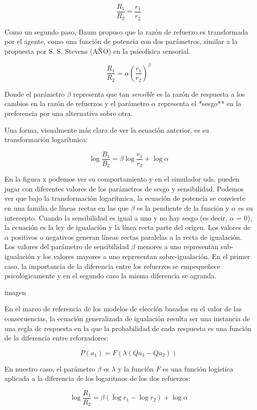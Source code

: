 \documentclass[
  letterpaper,
]{book}
\begin{document}
\[
\frac {R_1} {R_2} = \frac {r_1} {r_2}
\]

Como un segundo paso, Baum propuso que la razón de refuerzo es
transformada por el agente, como una función de potencia con dos
parámetros, similar a la propuesta por S. S. Stevens (AÑO) en la
psicofísica sensorial.

\[
\frac{R_1}{R_2} = \alpha \left( \frac{r_1}{ r_2} \right)^\beta
\]

Donde el parámetro \(\beta\) representa que tan \emph{sensible} es la
razón de respuesta a los cambios en la razón de refuerzos y el parámetro
\(\alpha\) representa el *sesgo** en la preferencia por una alternativa
sobre otra.

Una forma, visualmente más clara de ver la ecuación anterior, es su
transformación logarítmica:

\[
\log \frac{B_1}{B_2} = \beta \log\frac{r_1}{r_2} + \log \alpha
\]

En la figura x podemos ver su comportamiento y en el simulador uds.
pueden jugar con diferentes valores de los parámetros de sesgo y
sensibilidad. Podemos ver que bajo la transformación logarítmica, la
ecuación de potencia se convierte en una familia de líneas rectas en las
que \(\beta\) es la pendiente de la función y \(\alpha\) es su
intercepto. Cuando la sensibilidad es igual a uno y no hay sesgo (es
decir, \(\alpha\) = 0), la ecuación es la ley de igualación y la línea
recta parte del origen. Los valores de \(\alpha\) positivos o negativos
generan líneas rectas paralelas a la recta de igualación. Los valores
del parámetro de sensibilidad \(\beta\) menores a uno representan
sub-igualación y los valores mayores a uno representan sobre-igualación.
En el primer caso, la importancia de la diferencia entre los refuerzos
se empequeñece psicológicamente y en el segundo caso la misma diferencia
se agranda.

imagen

En el marco de referencia de los modelos de elección basados en el valor
de las consecuencias, la ecuación generalizada de igualación resulta ser
una instancia de una regla de respuesta en la que la probabilidad de
cada respuesta es una función de la diferencia entre reforzadores:

\[
P(a_1)= F(\lambda(Qa_1 -Qa_2))
\]

En nuestro caso, el parámetro \(\beta\) es \(\lambda\) y la función
\(F\) es una función logística aplicada a la diferencia de los
logaritmos de los dos refuerzos:

\[
\log \frac{R_1}{R_2} = \beta (\log{r_1} - \log{r_2}) + \log \alpha
\]
\end{document}
